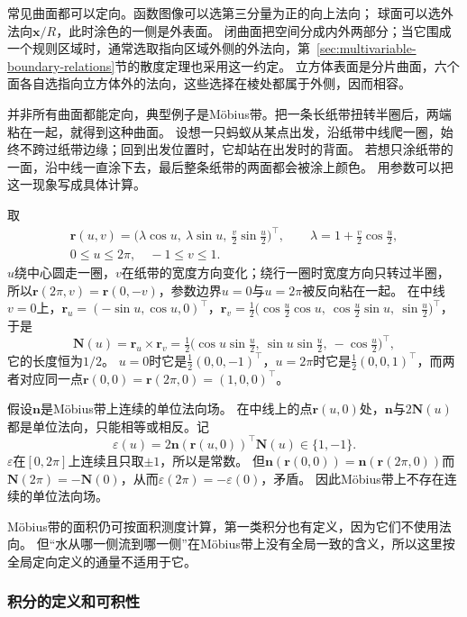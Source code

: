 常见曲面都可以定向。函数图像可以选第三分量为正的向上法向；
球面可以选外法向$\bm x/R$，此时涂色的一侧是外表面。
闭曲面把空间分成内外两部分；当它围成一个规则区域时，通常选取指向区域外侧的外法向，第~\ref{sec:multivariable-boundary-relations}节的散度定理也采用这一约定。
立方体表面是分片曲面，六个面各自选指向立方体外的法向，这些选择在棱处都属于外侧，因而相容。

并非所有曲面都能定向，典型例子是Möbius带。把一条长纸带扭转半圈后，两端粘在一起，就得到这种曲面。
设想一只蚂蚁从某点出发，沿纸带中线爬一圈，始终不跨过纸带边缘；回到出发位置时，它却站在出发时的背面。
若想只涂纸带的一面，沿中线一直涂下去，最后整条纸带的两面都会被涂上颜色。
用参数可以把这一现象写成具体计算。

\begin{example}[Möbius带上的法向绕行一圈后反向]
\label{ex:analysis-mobius-normal-reversal}
取
\[
 \begin{gathered}
 \bm r(u,v)=\bigl(\lambda\cos u,\ \lambda\sin u,\ \tfrac v2\sin\tfrac u2\bigr)^\top,
 \qquad \lambda=1+\tfrac v2\cos\tfrac u2,\\
 0\leq u\leq2\pi,\quad -1\leq v\leq1.
 \end{gathered}
\]
$u$绕中心圆走一圈，$v$在纸带的宽度方向变化；绕行一圈时宽度方向只转过半圈，所以$\bm r(2\pi,v)=\bm r(0,-v)$，参数边界$u=0$与$u=2\pi$被反向粘在一起。
在中线$v=0$上，$\bm r_u=(-\sin u,\cos u,0)^\top$，$\bm r_v=\tfrac12\bigl(\cos\tfrac u2\cos u,\ \cos\tfrac u2\sin u,\ \sin\tfrac u2\bigr)^\top$，于是
\[
 \bm N(u)=\bm r_u\times\bm r_v=\tfrac12\bigl(\cos u\sin\tfrac u2,\ \sin u\sin\tfrac u2,\ -\cos\tfrac u2\bigr)^\top,
\]
它的长度恒为$1/2$。
$u=0$时它是$\frac12(0,0,-1)^\top$，$u=2\pi$时它是$\frac12(0,0,1)^\top$，而两者对应同一点$\bm r(0,0)=\bm r(2\pi,0)=(1,0,0)^\top$。

假设$\bm n$是Möbius带上连续的单位法向场。
在中线上的点$\bm r(u,0)$处，$\bm n$与$2\bm N(u)$都是单位法向，只能相等或相反。记
\[
 \varepsilon(u)=2\bm n(\bm r(u,0))^\top\bm N(u)\in\{1,-1\}.
\]
$\varepsilon$在$[0,2\pi]$上连续且只取$\pm1$，所以是常数。
但$\bm n(\bm r(0,0))=\bm n(\bm r(2\pi,0))$而$\bm N(2\pi)=-\bm N(0)$，从而$\varepsilon(2\pi)=-\varepsilon(0)$，矛盾。
因此Möbius带上不存在连续的单位法向场。
\end{example}

Möbius带的面积仍可按面积测度计算，第一类积分也有定义，因为它们不使用法向。
但“水从哪一侧流到哪一侧”在Möbius带上没有全局一致的含义，所以这里按全局定向定义的通量不适用于它。

\subsubsection{积分的定义和可积性}


